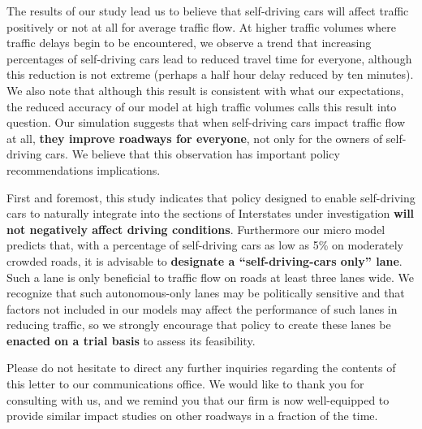 \documentclass[12pt,stdletter,orderfromtodate,sigleft]{newlfm}
\begin{document}
\begin{newlfm}
The results of our study lead us to believe that self-driving cars will affect traffic positively or not at all for average traffic flow. At higher traffic volumes where traffic delays begin to be encountered, we observe a trend that increasing percentages of self-driving cars lead to reduced travel time for everyone, although this reduction is not extreme (perhaps a half hour delay reduced by ten minutes).  We also note that although this result is consistent with what our expectations, the reduced accuracy of our model at high traffic volumes calls this result into question.  Our simulation suggests that when self-driving cars impact traffic flow at all, \textbf{they improve roadways for everyone}, not only for the owners of self-driving cars. We believe that this observation has important policy recommendations implications.

First and foremost, this study indicates that policy designed to enable self-driving cars to naturally integrate into the sections of Interstates under investigation \textbf{will not negatively affect driving conditions}.  Furthermore our micro model predicts that, with a percentage of self-driving cars as low as 5\% on moderately crowded roads, it is advisable to \textbf{designate a ``self-driving-cars only'' lane}.  Such a lane is only beneficial to traffic flow on roads at least three lanes wide. We recognize that such autonomous-only lanes may be politically sensitive and that factors not included in our models may affect the performance of such lanes in reducing traffic, so we strongly encourage that policy to create these lanes be \textbf{enacted on a trial basis} to assess its feasibility.   

Please do not hesitate to direct any further inquiries regarding the contents of this letter to our communications office.  We would like to thank you for consulting with us, and we remind you that our firm is now well-equipped to provide similar impact studies on other roadways in a fraction of the time.

\end{newlfm}
\end{document}
